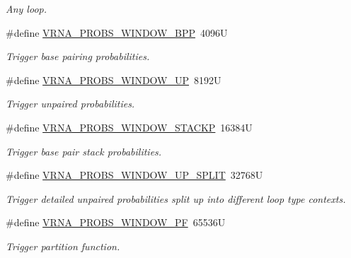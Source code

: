 \begin{DoxyCompactItemize}
\begin{DoxyCompactList}\small\item\em Any loop. \end{DoxyCompactList}\item 
\#define \mbox{\hyperlink{group__part__func__window_ga296217b76e76e5f7e6927e7210aa9b1f}{V\+R\+N\+A\+\_\+\+P\+R\+O\+B\+S\+\_\+\+W\+I\+N\+D\+O\+W\+\_\+\+B\+PP}}~4096U
\begin{DoxyCompactList}\small\item\em Trigger base pairing probabilities. \end{DoxyCompactList}\item 
\#define \mbox{\hyperlink{group__part__func__window_ga18325811c7dfc7b7d9d4ac37f4353615}{V\+R\+N\+A\+\_\+\+P\+R\+O\+B\+S\+\_\+\+W\+I\+N\+D\+O\+W\+\_\+\+UP}}~8192U
\begin{DoxyCompactList}\small\item\em Trigger unpaired probabilities. \end{DoxyCompactList}\item 
\#define \mbox{\hyperlink{group__part__func__window_ga0a13fc668b02f21b225e2334e4caac08}{V\+R\+N\+A\+\_\+\+P\+R\+O\+B\+S\+\_\+\+W\+I\+N\+D\+O\+W\+\_\+\+S\+T\+A\+C\+KP}}~16384U
\begin{DoxyCompactList}\small\item\em Trigger base pair stack probabilities. \end{DoxyCompactList}\item 
\#define \mbox{\hyperlink{group__part__func__window_ga9068f4ec008bf1c042a9357f5c2c5e13}{V\+R\+N\+A\+\_\+\+P\+R\+O\+B\+S\+\_\+\+W\+I\+N\+D\+O\+W\+\_\+\+U\+P\+\_\+\+S\+P\+L\+IT}}~32768U
\begin{DoxyCompactList}\small\item\em Trigger detailed unpaired probabilities split up into different loop type contexts. \end{DoxyCompactList}\item 
\#define \mbox{\hyperlink{group__part__func__window_ga4b79137d9b28b1f9cac7983792ce34a0}{V\+R\+N\+A\+\_\+\+P\+R\+O\+B\+S\+\_\+\+W\+I\+N\+D\+O\+W\+\_\+\+PF}}~65536U
\begin{DoxyCompactList}\small\item\em Trigger partition function. \end{DoxyCompactList}\end{DoxyCompactItemize}

